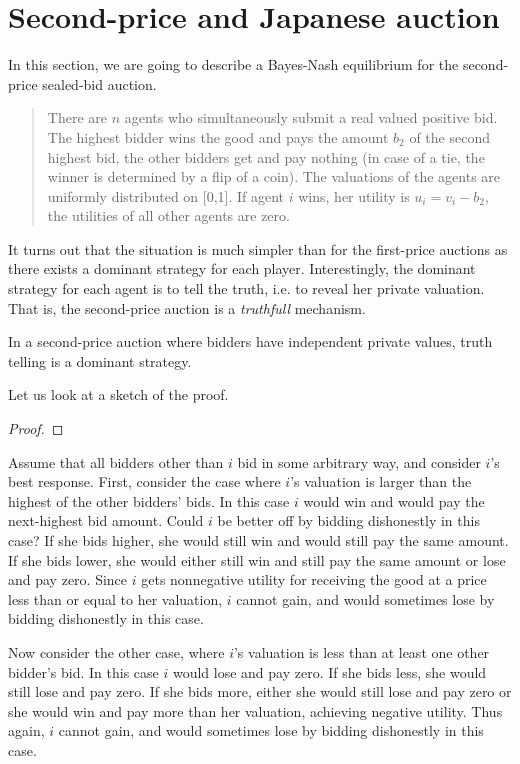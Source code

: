 \section{Second-price and Japanese auction}
\label{sec:auc:4}
In this section, we are going to describe a Bayes-Nash equilibrium for the second-price sealed-bid auction.

\begin{quote}
There are $n$ agents who simultaneously submit a real valued positive bid. The highest bidder wins the good and pays the amount $b_{2}$ of the second highest bid, the other bidders get and pay nothing (in case of a tie, the winner is determined by a flip of a coin).
%
The valuations of the agents are uniformly distributed on [0,1]. If agent $i$ wins, her utility is $u_i = v_i - b_{2}$, the utilities of all other agents are zero.
\end{quote}

 It turns out that the situation is much simpler than for the first-price auctions as there exists a dominant strategy for each player. Interestingly, the dominant strategy for each agent is to tell the truth, i.e. to reveal her private valuation. That is, the second-price auction is a \emph{truthfull} mechanism.

\begin{theorem}
In a second-price auction where bidders have independent private values, truth telling is a dominant strategy.
\end{theorem}

Let us look at a sketch of the proof.
\begin{proof}
	
\end{proof}

Assume that all bidders other than $i$ bid in some arbitrary way, and consider $i$'s best response. First, consider the case where $i$'s valuation is larger
than the highest of the other bidders' bids. In this case $i$ would win and would pay the next-highest bid amount. Could $i$ be better off by bidding dishonestly in this case? If she bids higher, she would still win
and would still pay the same amount.
If she bids lower, she would either still win and still pay the same amount or lose and pay zero.
Since $i$ gets nonnegative utility for receiving the good at a price less than or equal to her valuation, $i$ cannot gain, and would sometimes lose by bidding dishonestly in this case.

Now consider the
other case, where $i$'s valuation is less than at least one other bidder's bid. In
this case $i$ would lose and pay zero. If she bids less, she would still lose and pay zero. If she bids more, either she would still lose and pay zero or she would win and pay more than her valuation, achieving negative utility. Thus again, $i$ cannot gain, and would sometimes lose by bidding dishonestly in this case.


